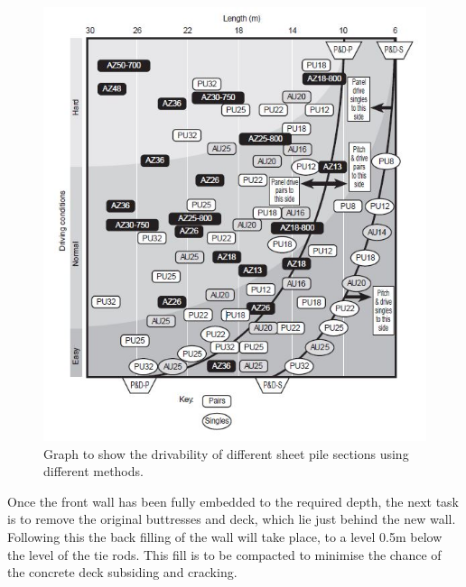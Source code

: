 \documentclass[12pt, a4paper]{article}
\begin{document}
 \begin{figure}[H]
\centering
  	\includegraphics[width=0.4\textheight]{drive}
   	\caption{Graph to show the drivability of different sheet pile sections using different methods. \cite{d}}
	\label{drive}
\end{figure}     
                               
\begin{justify}
 Once the front wall has been fully embedded to the required depth, the next task is to remove the original buttresses and deck, which lie just behind the new wall. Following this the back filling of the wall will take place, to a level 0.5m below the level of the tie rods. This fill is to be compacted to minimise the chance of the concrete deck subsiding and cracking.  
\end{justify}
\end{document}
